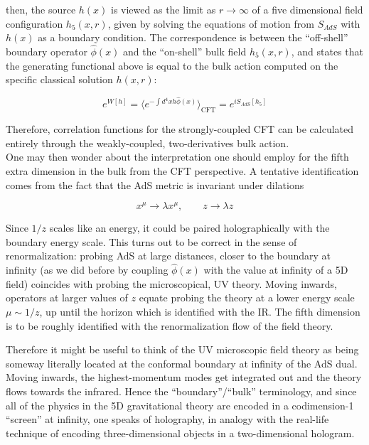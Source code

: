then, the source $h(x)$ is viewed as the limit as $r \rightarrow \infty$ of a five dimensional field configuration $h_5(x,r)$, given by solving the equations of motion from $S_{AdS}$ with $h(x)$ as a boundary condition. The correspondence is between the ``off-shell'' boundary operator $\hat \phi(x)$ and the ``on-shell'' bulk field $h_5(x,r)$, and states\cite{Witten:adshol} that the generating functional above is equal to the bulk action computed on the specific classical solution $h(x,r)$:

\begin{equation}
	e^{W[h]} = \langle e^{-\int d^4 x h \hat \phi(x)} \rangle_\text{CFT} = e^{iS_{AdS}[h_5]}
	\label{}
\end{equation}

Therefore, correlation functions for the strongly-coupled CFT can be calculated entirely through the weakly-coupled, two-derivatives bulk action.\\

One may then wonder about the interpretation one should employ for the fifth extra dimension in the bulk from the CFT perspective. A tentative identification comes from the fact that the AdS metric is invariant under dilations

\begin{equation}
	x^\mu \rightarrow \lambda x^\mu, \quad \quad z \rightarrow \lambda z
	\label{}
\end{equation}

Since $1/z$ scales like an energy, it could be paired holographically with the boundary energy scale. This turns out to be correct in the sense of renormalization: probing AdS at large distances, closer to the boundary at infinity (as we did before by coupling $\hat\phi(x)$ with the value at infinity of a 5D field) coincides with probing the microscopical, UV theory. Moving inwards, operators at larger values of $z$ equate probing the theory at a lower energy scale $\mu \sim 1/z$, up until the horizon which is identified with the IR. The fifth dimension is to be roughly identified with the renormalization flow of the field theory.

Therefore it might be useful to think of the UV microscopic field theory as being someway literally located at the conformal boundary at infinity of the AdS dual. Moving inwards, the highest-momentum modes get integrated out and the theory flows towards the infrared. Hence the ``boundary''/``bulk'' terminology, and since all of the physics in the 5D gravitational theory are encoded in a codimension-1 ``screen'' at infinity, one speaks of holography, in analogy with the real-life technique of encoding three-dimensional objects in a two-dimensional hologram.

